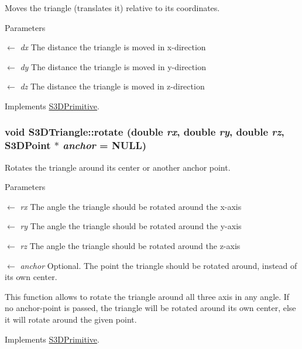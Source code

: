 Moves the triangle (translates it) relative to its coordinates. 


\begin{DoxyParams}{Parameters}
\item[\mbox{$\leftarrow$} {\em dx}]The distance the triangle is moved in x-\/direction \item[\mbox{$\leftarrow$} {\em dy}]The distance the triangle is moved in y-\/direction \item[\mbox{$\leftarrow$} {\em dz}]The distance the triangle is moved in z-\/direction \end{DoxyParams}


Implements \hyperlink{class_s3_d_primitive_a73a178ec2e1aa8e95f01baf0552724a9}{S3DPrimitive}.

\hypertarget{class_s3_d_triangle_a3e739f6c9c176e58cb734db7328cf039}{
\subsubsection[{rotate}]{\setlength{\rightskip}{0pt plus 5cm}void S3DTriangle::rotate (double {\em rx}, \/  double {\em ry}, \/  double {\em rz}, \/  {\bf S3DPoint} $\ast$ {\em anchor} = {\ttfamily NULL})}}
\label{class_s3_d_triangle_a3e739f6c9c176e58cb734db7328cf039}


Rotates the triangle around its center or another anchor point. 


\begin{DoxyParams}{Parameters}
\item[\mbox{$\leftarrow$} {\em rx}]The angle the triangle should be rotated around the x-\/axis \item[\mbox{$\leftarrow$} {\em ry}]The angle the triangle should be rotated around the y-\/axis \item[\mbox{$\leftarrow$} {\em rz}]The angle the triangle should be rotated around the z-\/axis \item[\mbox{$\leftarrow$} {\em anchor}]Optional. The point the triangle should be rotated around, instead of its own center.\end{DoxyParams}
This function allows to rotate the triangle around all three axis in any angle. If no anchor-\/point is passed, the triangle will be rotated around its own center, else it will rotate around the given point. 

Implements \hyperlink{class_s3_d_primitive_a23eb36b6bd48643e8f7be4b950592d9e}{S3DPrimitive}.


